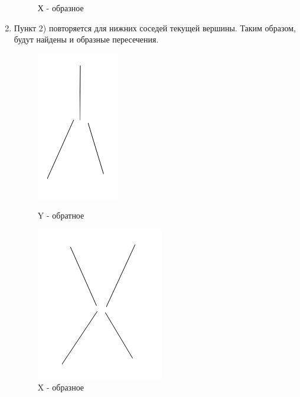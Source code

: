 \begin{enumerate}
\begin{figure}[!h]
\begin{minipage}{0.45\textwidth}
			\caption[X]{Х - образное}
			\label{fig:xcross}
		\end{minipage}
	\end{figure}
	
	\item Пункт 2) повторяется для нижних соседей текущей вершины. Таким образом, будут найдены  и  образные пересечения.
	\begin{figure}[!h]
		\centering
		\begin{minipage}{0.45\textwidth}
			\centering
			\includegraphics[width=0.7\linewidth,height=0.7\linewidth]{pictures/Y_cross_revert}
			\caption[Y - обратное]{Y - обратное}
			\label{fig:ycrossrevert}
		\end{minipage}
		\begin{minipage}{0.45\textwidth}
			\centering
			\includegraphics[width=0.7\linewidth,height=0.7\linewidth]{pictures/X_cross}
			\caption[X]{X - образное}
			\label{fig:xcross_revert}
		\end{minipage}
	\end{figure}
\end{enumerate}
\newpage

